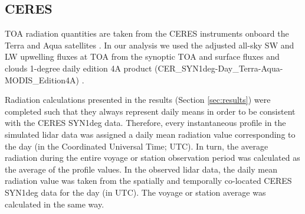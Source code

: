 \documentclass[draft]{agujournal2019}
\begin{document}
\subsection{CERES}

TOA radiation quantities are taken from the CERES instruments onboard the Terra and Aqua satellites . In our analysis we used the adjusted all-sky SW and LW upwelling fluxes at TOA from the synoptic TOA and surface fluxes and clouds 1-degree daily edition 4A product (CER\_SYN1deg-Day\_Terra-Aqua-MODIS\_Edition4A) .

Radiation calculations presented in the results (Section \ref{sec:results}) were completed such that they always represent daily means in order to be consistent with the CERES SYN1deg data. Therefore, every instantaneous profile in the simulated lidar data was assigned a daily mean radiation value corresponding to the day (in the Coordinated Universal Time; UTC). In turn, the average radiation during the entire voyage or station observation period was calculated as the average of the profile values. In the observed lidar data, the daily mean radiation value was taken from the spatially and temporally co-located CERES SYN1deg data for the day (in UTC). The voyage or station average was calculated in the same way.
\end{document}
